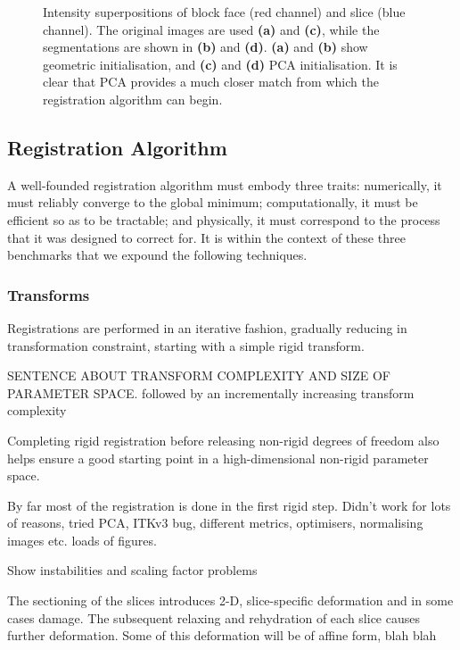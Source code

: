 \begin{figure}[htbp]
      \caption{Intensity superpositions of block face (red channel) and slice (blue channel). The original images are used \textbf{(a)} and \textbf{(c)}, while the segmentations are shown in \textbf{(b)} and \textbf{(d)}. \textbf{(a)} and \textbf{(b)} show geometric initialisation, and \textbf{(c)} and \textbf{(d)} PCA initialisation. It is clear that PCA provides a much closer match from which the registration algorithm can begin.}
      \label{fig:582_pca}
    \end{figure}
    
  
  \subsection{Registration Algorithm} %
  \label{sub:registration_algorithm}
    A well-founded registration algorithm must embody three traits: numerically, it must reliably converge to the global minimum; computationally, it must be efficient so as to be tractable; and physically, it must correspond to the process that it was designed to correct for. It is within the context of these three benchmarks that we expound the following techniques.
    
    \subsubsection{Transforms} %
    \label{ssub:transforms}
      Registrations are performed in an iterative fashion, gradually reducing in transformation constraint, starting with a simple rigid transform.
    
SENTENCE ABOUT TRANSFORM COMPLEXITY AND SIZE OF PARAMETER SPACE.  followed by an incrementally increasing transform complexity 

Completing rigid registration before releasing non-rigid degrees of freedom also helps ensure a good starting point in a high-dimensional non-rigid parameter space. 

By far most of the registration is done in the first rigid step. Didn't work for lots of reasons, tried PCA, ITKv3 bug, different metrics, optimisers, normalising images etc. loads of figures.

Show instabilities and scaling factor problems

The sectioning of the slices introduces 2-D, slice-specific deformation and in some cases damage. The subsequent relaxing and rehydration of each slice causes further deformation. Some of this deformation will be of affine form, blah blah

